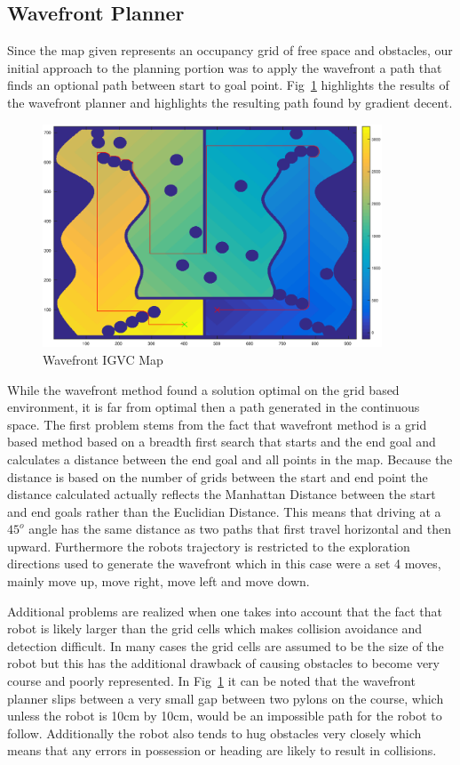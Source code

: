 \documentclass{article}
\begin{document}
\subsection{Wavefront Planner}
\label{subsec:wavefront}
Since the map given represents an occupancy grid of free space and obstacles, our initial approach to the planning portion was to apply the wavefront a path that finds an optional path between start to goal point. Fig~\ref{fig:wavefront} highlights the results of the wavefront planner and highlights the resulting path found by gradient decent. 
\begin{figure}[H]
	\centering
	\includegraphics[width=0.9\textwidth]{images/wavefront_igvc.eps}
	\caption{Wavefront IGVC Map}
	\label{fig:wavefront}
\end{figure}

While the wavefront method found a solution optimal on the grid based environment, it is far from optimal then a path generated in the continuous space. The first problem stems from the fact that wavefront method is a grid based method based on a breadth first search that starts and the end goal and calculates a distance between the end goal and all points in the map. Because the distance is based on the number of grids between the start and end point the distance calculated actually reflects the Manhattan Distance between the start and end goals rather than the Euclidian Distance. This means that driving at a $45^o $ angle has the same distance as two paths that first travel horizontal and then upward. Furthermore the robots trajectory is restricted to the exploration directions used to generate the wavefront which in this case were a set 4 moves, mainly move up, move right, move left and move down. 

Additional problems are realized when one takes into account that the fact that robot is likely larger than the grid cells which makes collision avoidance and detection difficult. In many cases the grid cells are assumed to be the size of the robot but this has the additional drawback of causing obstacles to become very course and poorly represented. In Fig~\ref{fig:wavefront} it can be noted that the wavefront planner slips between a very small gap between two pylons on the course, which unless the robot is 10cm by 10cm, would be an impossible path for the robot to follow. Additionally the robot also tends to hug obstacles very closely which means that any errors in possession or heading are likely to result in collisions. 
\end{document}
